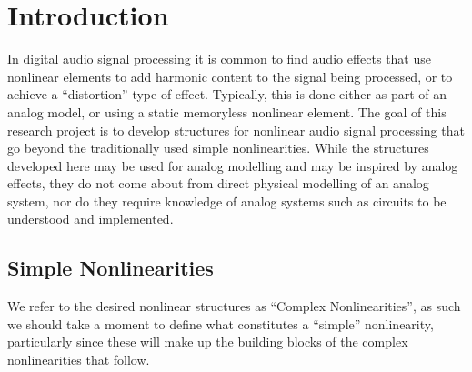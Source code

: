 \documentclass[twoside,a4paper]{article}
\title{\papertitle}
\affiliation{
\paperauthorA \,}
{\href{http://ccrma.stanford.edu}{Center for Computer Research in Music and Acoustics} \\ Stanford University \\ Palo Alto, CA \\ {\tt \href{mailto:jatin@ccrma.stanford.edu}{jatin@ccrma.stanford.edu}}}
\newif\ifpdf
\begin{document}
\ifpdf %
  \DeclareGraphicsExtensions{.png,.jpg,.pdf}
\else  %
\fi

\maketitle
%
\begin{abstract}
In this writing, we present an ongoing study of new and interesting
nonlinear structures for audio signal processing, intended to be
used for audio effects and synthesis. We give a brief discussion of
each structure, and present a series of open-source audio plugins that
implement the structures.
\end{abstract}

\section{Introduction} \label{sec:intro}
%
In digital audio signal processing it is common to find audio effects
that use nonlinear elements to add harmonic content to the signal being
processed, or to achieve a ``distortion'' type of effect. Typically, this
is done either as part of an analog model, or using a static memoryless
nonlinear element.
\newline\newline
%
The goal of this research project is to develop structures for nonlinear
audio signal processing that go beyond the traditionally used simple
nonlinearities. While the structures developed here may be used for
analog modelling and may be inspired by analog effects, they do not
come about from direct physical modelling of an analog system, nor
do they require knowledge of analog systems such as circuits to be
understood and implemented.

\subsection{Simple Nonlinearities} \label{sec:simple}
%
We refer to the desired nonlinear structures as ``Complex
Nonlinearities'', as such we should take a moment to define what
constitutes a ``simple'' nonlinearity, particularly since these will
make up the building blocks of the complex nonlinearities that follow.
\end{document}
